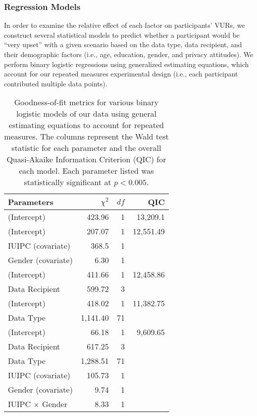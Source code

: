 
\subsubsection{Regression Models} 
\label{sec:regression}
In order to examine the relative effect of each factor on participants' VURs, we construct several statistical models to predict whether a participant would be ``very upset'' with a given scenario based on the data type, data recipient, and their demographic factors (i.e., age, education, gender, and privacy attitudes). We perform binary logistic regressions using generalized estimating equations, which account for our repeated measures experimental design (i.e., each participant contributed multiple data points).

\begin{table}[t]
\centering
\begin{tabular}{|l| r| r| r|}
\hline
Parameters & $\chi^2$ & $df$ & QIC\\
\hline
\hline
(Intercept) & 423.96 & 1 & 13,209.1\\
\hline
(Intercept) & 207.07 & 1 & 12,551.49\\
IUIPC (covariate) & 368.5 & 1 & \\
Gender (covariate) & 6.30 & 1 & \\
\hline
(Intercept) & 411.66 & 1 &12,458.86\\
Data Recipient & 599.72 & 3 & \\
\hline
(Intercept) & 418.02 & 1 & 11,382.75\\
Data Type & 1,141.40 & 71 & \\
\hline
(Intercept) & 66.18 & 1 & 9,609.65 \\
Data Recipient & 617.25 & 3 & \\
Data Type & 1,288.51 & 71 & \\
IUIPC (covariate) & 105.73 & 1 & \\
Gender (covariate) & 9.74 & 1 & \\
IUIPC $\times$ Gender & 8.33 & 1 &\\
\hline
\end{tabular}
\caption{Goodness-of-fit metrics for various binary logistic models of our data using general estimating equations to account for repeated measures. The columns represent the Wald test statistic for each parameter and the overall Quasi-Akaike Information Criterion (QIC) for each model. Each parameter listed was statistically significant at $p<0.005$.}
\label{regression}
\end{table}


